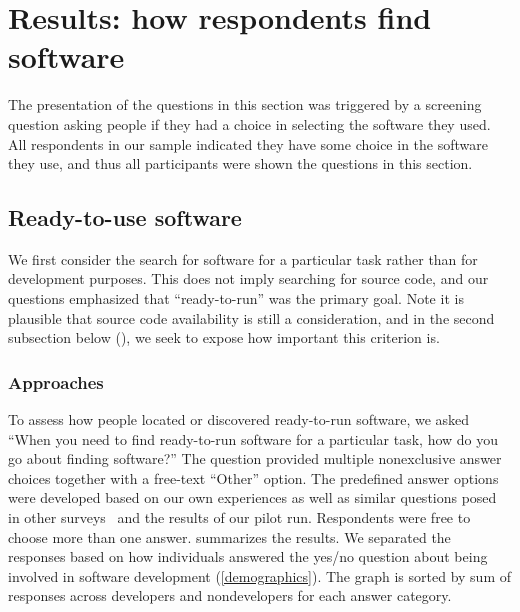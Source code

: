 \documentclass{casicswhitepaper}
\begin{document}
\section{Results: how respondents find software}

The presentation of the questions in this section was triggered by a screening question asking people if they had a choice in selecting the software they used.  All respondents in our sample indicated they have some choice in the software they use, and thus all participants were shown the questions in this section.


\subsection{Ready-to-use software}
 
We first consider the search for software for a particular task rather than for development purposes. This does not imply searching for source code, and our questions emphasized that ``ready-to-run'' was the primary goal.  Note it is plausible that source code availability is still a consideration, and in the second subsection below (), we seek to expose how important this criterion is.

 
\subsubsection{Approaches}
\label{approaches-ready-to-use}

To assess how people located or discovered ready-to-run software, we asked ``When you need to find ready-to-run software for a particular task, how do you go about finding software?''  The question provided multiple nonexclusive answer choices together with a free-text ``Other'' option.  The predefined answer options were developed based on our own experiences as well as similar questions posed in other surveys~\cite{sim_2011, bajrachary_2009, linstead_2009} and the results of our pilot run.  Respondents were free to choose more than one answer.   summarizes the results.  We separated the responses based on how individuals answered the yes/no question about being involved in software development (\ref{demographics}).  The graph is sorted by sum of responses across developers and nondevelopers for each answer category.
\end{document}
